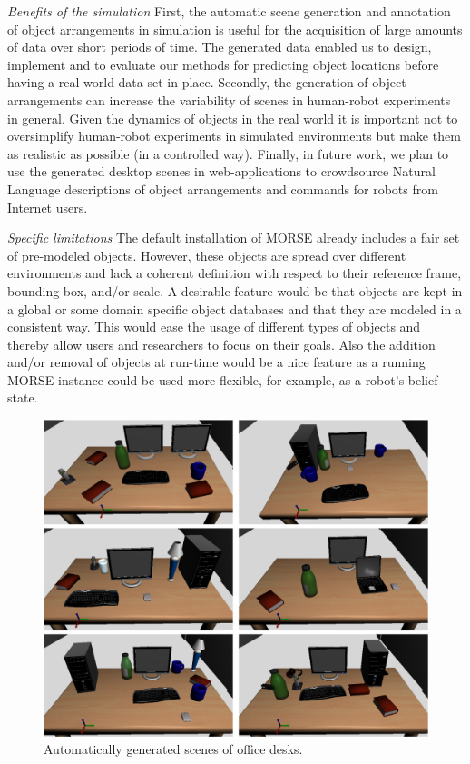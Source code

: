 \documentclass[conference]{IEEEtran}
\begin{document}
\emph{Benefits of the simulation} First, the automatic scene generation and
annotation of object arrangements in simulation is useful for the acquisition of
large amounts of data over short periods of time. The generated data enabled us
to design, implement and to evaluate our methods for predicting object locations
before having a real-world data set in place. Secondly, the generation of object
arrangements can increase the variability of scenes in human-robot experiments
in general. Given the dynamics of objects in the real world it is important not
to oversimplify human-robot experiments in simulated environments but make them
as realistic as possible (in a controlled way). Finally, in future work, we plan
to use the generated desktop scenes in web-applications to crowdsource Natural
Language descriptions of object arrangements and commands for robots from
Internet users.

\emph{Specific limitations} The default installation of MORSE already includes a
fair set of pre-modeled objects. However, these objects are spread over
different environments and lack a coherent definition with respect to their
reference frame, bounding box, and/or scale. A desirable feature would be that
objects are kept in a global or some domain specific object databases and that
they are modeled in a consistent way. This would ease the usage of different
types of objects and thereby allow users and researchers to focus on their
goals. Also the addition and/or removal of objects at run-time would be a nice
feature as a running MORSE instance could be used more flexible, for example,
as a robot's belief state.

\begin{figure}[tb]
  \centering
  \includegraphics[width=.9\columnwidth]{figs/scenes.png}
  \caption{Automatically generated scenes of office desks.}
  \label{fig:simulated-desktop-scenes}
\end{figure}
\end{document}
